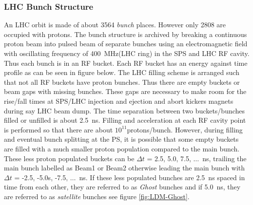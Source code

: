 \subsubsection{LHC Bunch Structure}
An LHC orbit is made of about 3564 \textit{bunch} places. However only 2808 are occupied with protons. The bunch structure is archived by  breaking a continuous proton beam into pulsed beam of separate bunches using an electromagnetic field  with oscillating frequency of 400~MHz(LHC ring) in the SPS and LHC RF cavity. Thus each bunch is in an RF bucket. Each RF bucket has an energy against time profile as can be seen in figure below. The LHC filling scheme is arranged such that not all RF buckets have proton bunches. Thus there are empty buckets or beam gaps with missing bunches. These gaps are necessary to make  room for the rise/fall times at SPS/LHC injection and ejection and abort kickers magnets during say LHC beam dump. The time separation between two buckets/bunches filled or unfilled is about 2.5~ns. Filling and acceleration at each RF cavity point is performed so that there are about $10^{11}$protons/bunch. However, during filling and eventual bunch splitting at the PS, it is possible that some empty buckets are filled with a much smaller proton population compared to the main bunch. These less proton populated buckets can be $\Delta t$ = 2.5, 5.0, 7.5, $\ldots$~ns, trailing the main bunch labelled as Beam1 or Beam2 otherwise leading the main bunch with $\Delta t$ = -2.5, -5.0s, -7.5, $\ldots$~ns. If these less populated bunches are 2.5~ns spaced in time from each other, they are referred to as \textit{Ghost} bunches and if 5.0~ns, they are referred to as \textit{satellite} bunches see figure \eqref{fig:LDM-Ghost}.

